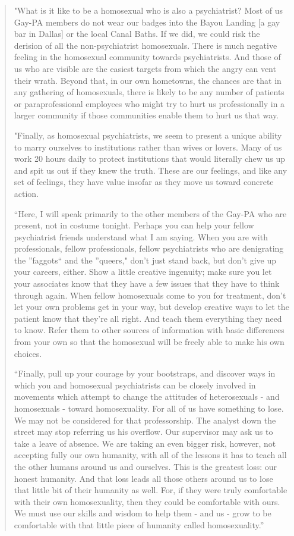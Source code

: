 \begin{refsection}
\begin{quote}
"What is it like to be a homosexual who is also a psychiatrist? Most of us Gay-PA members do not wear our badges into the Bayou Landing [a gay bar in Dallas] or the local Canal Baths. If we did, we could risk the derision of all the non-psychiatrist homosexuals. There is much negative feeling in the homosexual community towards psychiatrists. And those of us who are visible are the easiest targets from which the angry can vent their wrath. Beyond that, in our own hometowns, the chances are that in any gathering of homosexuals, there is likely to be any number of patients or paraprofessional employees who might try to hurt us professionally in a larger community if those communities enable them to hurt us that way.

"Finally, as homosexual psychiatrists, we seem to present a unique ability to marry ourselves to institutions rather than wives or lovers. Many of us work 20 hours daily to protect institutions that would literally chew us up and spit us out if they knew the truth. These are our feelings, and like any set of feelings, they have value insofar as they move us toward concrete action.

``Here, I will speak primarily to the other members of the Gay-PA who are present, not in costume tonight. Perhaps you can help your fellow psychiatrist friends understand what I am saying. When you are with professionals, fellow professionals, fellow psychiatrists who are denigrating the ''faggots`` and the ''queers," don’t just stand back, but don’t give up your careers, either. Show a little creative ingenuity; make sure you let your associates know that they have a few issues that they have to think through again. When fellow homosexuals come to you for treatment, don’t let your own problems get in your way, but develop creative ways to let the patient know that they’re all right. And teach them everything they need to know. Refer them to other sources of information with basic differences from your own so that the homosexual will be freely able to make his own choices.

``Finally, pull up your courage by your bootstraps, and discover ways in which you and homosexual psychiatrists can be closely involved in movements which attempt to change the attitudes of heterosexuals - and homosexuals - toward homosexuality. For all of us have something to lose. We may not be considered for that professorship. The analyst down the street may stop referring us his overflow. Our supervisor may ask us to take a leave of absence. We are taking an even bigger risk, however, not accepting fully our own humanity, with all of the lessons it has to teach all the other humans around us and ourselves. This is the greatest loss: our honest humanity. And that loss leads all those others around us to lose that little bit of their humanity as well. For, if they were truly comfortable with their own homosexuality, then they could be comfortable with ours. We must use our skills and wisdom to help them - and us - grow to be comfortable with that little piece of humanity called homosexuality.''


\end{quote}
\end{refsection}
